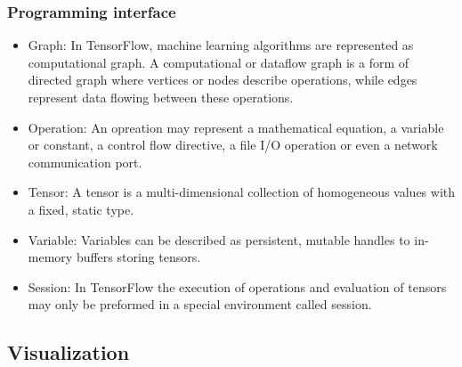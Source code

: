 \begin{frame}
  \MyLogo
  \frametitle{Programming interface}
  \begin{itemize}
	  	\item Graph: In TensorFlow, machine learning algorithms are represented as computational graph. A computational or dataflow graph is a form of directed graph where vertices or nodes describe operations, while edges represent data flowing between these operations.
	  	
	  	\item Operation: An opreation may represent a mathematical equation, a variable or constant, a control flow directive, a file I/O operation or even a network communication port.
	  	
	  	\item Tensor: A tensor is a multi-dimensional collection of homogeneous values with a fixed, static type.
	  	
	  	\item Variable: Variables can be described as persistent, mutable handles to in-memory buffers storing tensors.
	  	
	  	\item Session: In TensorFlow the execution of operations and evaluation of tensors may only be preformed in a special environment called session.
  \end{itemize}

\end{frame}

\subsection{Visualization}

